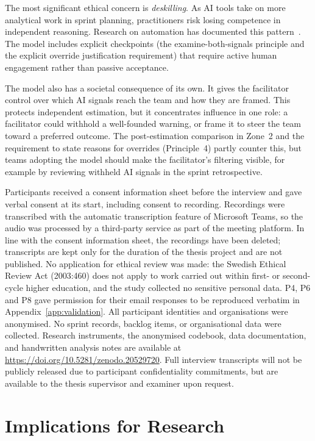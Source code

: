 \documentclass[a4paper,twoside]{bth}
\begin{document}
The most significant ethical concern is \textit{deskilling}. As AI tools take on more analytical work in sprint planning, practitioners risk losing competence in independent reasoning. Research on automation has documented this pattern~\cite{parasuraman2010complacency}. The model includes explicit checkpoints (the examine-both-signals principle and the explicit override justification requirement) that require active human engagement rather than passive acceptance.

The model also has a societal consequence of its own. It gives the facilitator control over which AI signals reach the team and how they are framed. This protects independent estimation, but it concentrates influence in one role: a facilitator could withhold a well-founded warning, or frame it to steer the team toward a preferred outcome. The post-estimation comparison in Zone~2 and the requirement to state reasons for overrides (Principle~4) partly counter this, but teams adopting the model should make the facilitator's filtering visible, for example by reviewing withheld AI signals in the sprint retrospective.

Participants received a consent information sheet before the interview and gave verbal consent at its start, including consent to recording. Recordings were transcribed with the automatic transcription feature of Microsoft Teams, so the audio was processed by a third-party service as part of the meeting platform. In line with the consent information sheet, the recordings have been deleted; transcripts are kept only for the duration of the thesis project and are not published. No application for ethical review was made: the Swedish Ethical Review Act (2003:460) does not apply to work carried out within first- or second-cycle higher education, and the study collected no sensitive personal data. P4, P6 and P8 gave permission for their email responses to be reproduced verbatim in Appendix~\ref{app:validation}. All participant identities and organisations were anonymised. No sprint records, backlog items, or organisational data were collected. Research instruments, the anonymised codebook, data documentation, and handwritten analysis notes are available at \url{https://doi.org/10.5281/zenodo.20529720}. Full interview transcripts will not be publicly released due to participant confidentiality commitments, but are available to the thesis supervisor and examiner upon request.

\section{Implications for Research}
\end{document}
